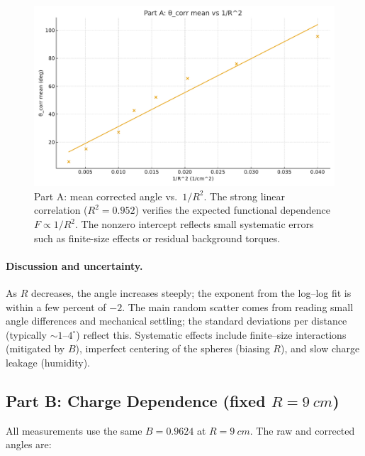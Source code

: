 \documentclass[12pt]{article}
\begin{document}
\begin{figure}[H]
  \centering
  \includegraphics[width=0.72\linewidth]{partA_invR2.pdf}
  \caption{Part A: mean corrected angle vs.\ $1/R^2$. The strong linear correlation ($R^2=0.952$) verifies the expected functional dependence $F\propto 1/R^2$. The nonzero intercept reflects small systematic errors such as finite-size effects or residual background torques.}
  \label{fig:partA_invR2}
\end{figure}

\paragraph{Discussion and uncertainty.}
As $R$ decreases, the angle increases steeply; the exponent from the log–log fit is within a few percent of $-2$. The main random scatter comes from reading small angle differences and mechanical settling; the standard deviations per distance (typically $\sim1$--$4^\circ$) reflect this. Systematic effects include finite–size interactions (mitigated by $B$), imperfect centering of the spheres (biasing $R$), and slow charge leakage (humidity).


\subsection*{Part B: Charge Dependence (fixed $R=\SI{9}{cm}$)}
All measurements use the same $B=0.9624$ at $R=\SI{9}{cm}$. The raw and corrected angles are:
\end{document}
